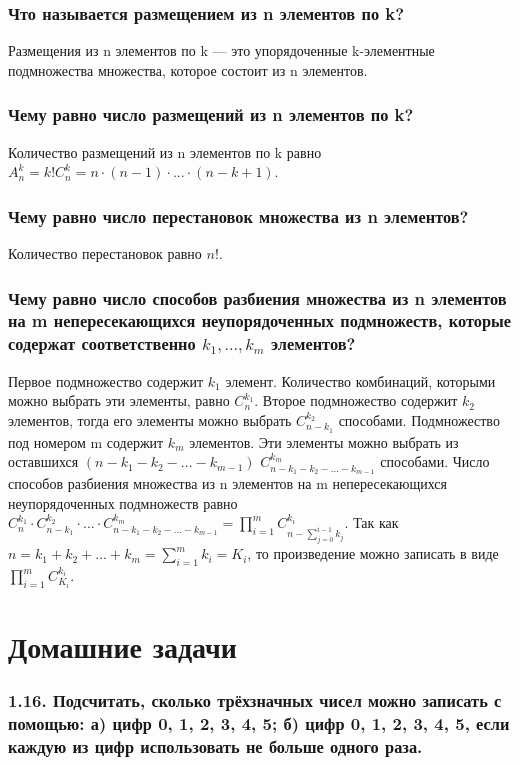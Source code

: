 \documentclass{book}
\begin{document}
\subsubsection*{Что называется размещением из n элементов по k?}
Размещения из n элементов по k --- это упорядоченные k-элементные подмножества множества, которое состоит из n элементов.

\subsubsection*{Чему равно число размещений из n элементов по k?}
Количество размещений из n элементов по k равно $A_n^k=k!C_n^k=n\cdot(n-1)\cdot...\cdot(n-k+1)$.

\subsubsection*{Чему равно число перестановок множества из n элементов?}
Количество перестановок равно $n!$.

\subsubsection*{Чему равно число способов разбиения множества из n элементов на m непересекающихся неупорядоченных подмножеств, которые содержат соответственно $k_1, ..., k_m$ элементов?}
Первое подмножество содержит $k_1$ элемент. Количество комбинаций, которыми можно выбрать эти элементы, равно $C_n^{k_1}$. Второе подмножество содержит $k_2$ элементов, тогда его элементы можно выбрать $C_{n-k_1}^{k_2}$ способами. Подмножество под номером m содержит $k_m$ элементов. Эти элементы можно выбрать из оставшихся $\left(n-k_1-k_2-...-k_{m-1}\right)$ $C_{n-k_1-k_2-...-k_{m-1}}^{k_m}$ способами. Число способов разбиения множества из n элементов на m непересекающихся неупорядоченных подмножеств равно $C_n^{k_1}\cdot C_{n-k_1}^{k_2}\cdot...\cdot C_{n-k_1-k_2-...-k_{m-1}}^{k_m}=\prod\limits_{i=1}^mC_{n-\sum\limits_{j=0}^{i-1}k_j}^{k_i}$. Так как $n=k_1+k_2+...+k_m=\sum\limits_{i=1}^m k_i=K_i$, то произведение можно записать в виде $\prod\limits_{i=1}^mC_{K_i}^{k_i}$.

\section*{Домашние задачи}

\subsubsection*{1.16. Подсчитать, сколько трёхзначных чисел можно записать с помощью: а) цифр 0, 1, 2, 3, 4, 5; б) цифр 0, 1, 2, 3, 4, 5, если каждую из цифр использовать не больше одного раза.}
\end{document}
